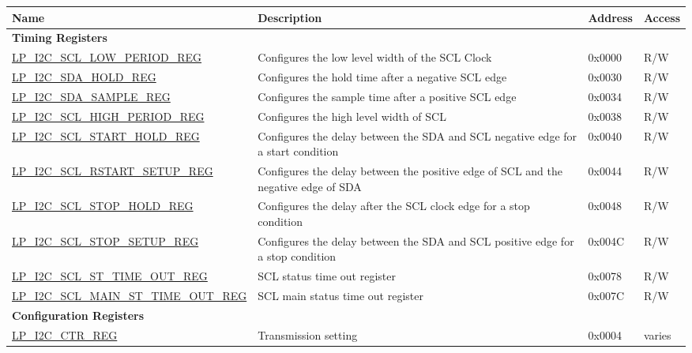 \begin{longtable}{ | p{6cm} | p{7.2cm} | p{1.3cm} | p{1cm} | }
    \hline\rowcolor{lightgray}
    \textbf{Name} & \textbf{Description} &  \textbf{Address} & \textbf{Access} \\ \hline
    \endhead
    \multicolumn{4}{|l|}{\textbf{Timing Registers}} \\ \hline
    \hyperref[regdesc:LPI2CSCLLOWPERIODREG]{LP\_I2C\_SCL\_LOW\_PERIOD\_REG} & Configures the low level width of the SCL Clock & 0x0000 & R/W \\ \hline
    \hyperref[regdesc:LPI2CSDAHOLDREG]{LP\_I2C\_SDA\_HOLD\_REG} & Configures the hold time after a negative SCL edge & 0x0030 & R/W \\ \hline
    \hyperref[regdesc:LPI2CSDASAMPLEREG]{LP\_I2C\_SDA\_SAMPLE\_REG} & Configures the sample time after a positive SCL edge & 0x0034 & R/W \\ \hline
    \hyperref[regdesc:LPI2CSCLHIGHPERIODREG]{LP\_I2C\_SCL\_HIGH\_PERIOD\_REG} & Configures the high level width of SCL & 0x0038 & R/W \\ \hline
    \hyperref[regdesc:LPI2CSCLSTARTHOLDREG]{LP\_I2C\_SCL\_START\_HOLD\_REG} & Configures the delay between the SDA and SCL negative edge for a start condition & 0x0040 & R/W \\ \hline
    \hyperref[regdesc:LPI2CSCLRSTARTSETUPREG]{LP\_I2C\_SCL\_RSTART\_SETUP\_REG} & Configures the delay between the positive edge of SCL and the negative edge of SDA & 0x0044 & R/W \\ \hline
    \hyperref[regdesc:LPI2CSCLSTOPHOLDREG]{LP\_I2C\_SCL\_STOP\_HOLD\_REG} & Configures the delay after the SCL clock edge for a stop condition & 0x0048 & R/W \\ \hline
    \hyperref[regdesc:LPI2CSCLSTOPSETUPREG]{LP\_I2C\_SCL\_STOP\_SETUP\_REG} & Configures the delay between the SDA and SCL positive edge for a stop condition & 0x004C & R/W \\ \hline
    \hyperref[regdesc:LPI2CSCLSTTIMEOUTREG]{LP\_I2C\_SCL\_ST\_TIME\_OUT\_REG} & SCL status time out register & 0x0078 & R/W \\ \hline
    \hyperref[regdesc:LPI2CSCLMAINSTTIMEOUTREG]{LP\_I2C\_SCL\_MAIN\_ST\_TIME\_OUT\_REG} & SCL main status time out register & 0x007C & R/W \\ \hline
    \multicolumn{4}{|l|}{\textbf{Configuration Registers}} \\ \hline
    \hyperref[regdesc:LPI2CCTRREG]{LP\_I2C\_CTR\_REG} & Transmission setting & 0x0004 & varies \\ \hline

\end{longtable}
